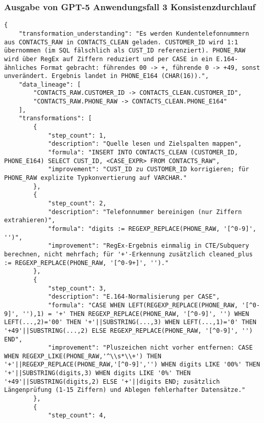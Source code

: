 \subsubsection{Ausgabe von GPT-5 Anwendungsfall 3 Konsistenzdurchlauf}\label{anhang:subsubsec:gpt_case3_prompt2}
\begin{lstlisting}[caption={Ausgabe: GPT-5 Anwendungsfall 3 Konsistenzdurchlauf},label={gpt_case3_prompt2}]
{
    "transformation_understanding": "Es werden Kundentelefonnummern aus CONTACTS_RAW in CONTACTS_CLEAN geladen. CUSTOMER_ID wird 1:1 übernommen (im SQL fälschlich als CUST_ID referenziert). PHONE_RAW wird über RegEx auf Ziffern reduziert und per CASE in ein E.164-ähnliches Format gebracht: führendes 00 -> +, führende 0 -> +49, sonst unverändert. Ergebnis landet in PHONE_E164 (CHAR(16)).",
    "data_lineage": [
        "CONTACTS_RAW.CUSTOMER_ID -> CONTACTS_CLEAN.CUSTOMER_ID",
        "CONTACTS_RAW.PHONE_RAW -> CONTACTS_CLEAN.PHONE_E164"
    ],
    "transformations": [
        {
            "step_count": 1,
            "description": "Quelle lesen und Zielspalten mappen",
            "formula": "INSERT INTO CONTACTS_CLEAN (CUSTOMER_ID, PHONE_E164) SELECT CUST_ID, <CASE_EXPR> FROM CONTACTS_RAW",
            "improvement": "CUST_ID zu CUSTOMER_ID korrigieren; für PHONE_RAW explizite Typkonvertierung auf VARCHAR."
        },
        {
            "step_count": 2,
            "description": "Telefonnummer bereinigen (nur Ziffern extrahieren)",
            "formula": "digits := REGEXP_REPLACE(PHONE_RAW, '[^0-9]', '')",
            "improvement": "RegEx-Ergebnis einmalig in CTE/Subquery berechnen, nicht mehrfach; für '+'-Erkennung zusätzlich cleaned_plus := REGEXP_REPLACE(PHONE_RAW, '[^0-9+]', '')."
        },
        {
            "step_count": 3,
            "description": "E.164-Normalisierung per CASE",
            "formula": "CASE WHEN LEFT(REGEXP_REPLACE(PHONE_RAW, '[^0-9]', ''),1) = '+' THEN REGEXP_REPLACE(PHONE_RAW, '[^0-9]', '') WHEN LEFT(...,2)='00' THEN '+'||SUBSTRING(...,3) WHEN LEFT(...,1)='0' THEN '+49'||SUBSTRING(...,2) ELSE REGEXP_REPLACE(PHONE_RAW, '[^0-9]', '') END",
            "improvement": "Pluszeichen nicht vorher entfernen: CASE WHEN REGEXP_LIKE(PHONE_RAW,'^\\s*\\+') THEN '+'||REGEXP_REPLACE(PHONE_RAW,'[^0-9]','') WHEN digits LIKE '00%' THEN '+'||SUBSTRING(digits,3) WHEN digits LIKE '0%' THEN '+49'||SUBSTRING(digits,2) ELSE '+'||digits END; zusätzlich Längenprüfung (1-15 Ziffern) und Ablegen fehlerhafter Datensätze."
        },
        {
            "step_count": 4,

\end{lstlisting}
